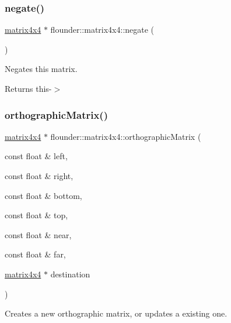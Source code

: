 \subsubsection{\texorpdfstring{negate()}{negate()}\hspace{0.1cm}{\footnotesize\ttfamily [2/2]}}
{\footnotesize\ttfamily \hyperlink{classflounder_1_1matrix4x4}{matrix4x4} $\ast$ flounder\+::matrix4x4\+::negate (\begin{DoxyParamCaption}{ }\end{DoxyParamCaption})}



Negates this matrix. 

\begin{DoxyReturn}{Returns}
this-\/$>$ 
\end{DoxyReturn}
\mbox{\label{classflounder_1_1matrix4x4_ae44bdcd9e5a3ad141801a9da313e3fba}} 
\subsubsection{\texorpdfstring{orthographic\+Matrix()}{orthographicMatrix()}}
{\footnotesize\ttfamily \hyperlink{classflounder_1_1matrix4x4}{matrix4x4} $\ast$ flounder\+::matrix4x4\+::orthographic\+Matrix (\begin{DoxyParamCaption}\item[{const float \&}]{left,  }\item[{const float \&}]{right,  }\item[{const float \&}]{bottom,  }\item[{const float \&}]{top,  }\item[{const float \&}]{near,  }\item[{const float \&}]{far,  }\item[{\hyperlink{classflounder_1_1matrix4x4}{matrix4x4} $\ast$}]{destination }\end{DoxyParamCaption})\hspace{0.3cm}{\ttfamily [static]}}



Creates a new orthographic matrix, or updates a existing one. 


